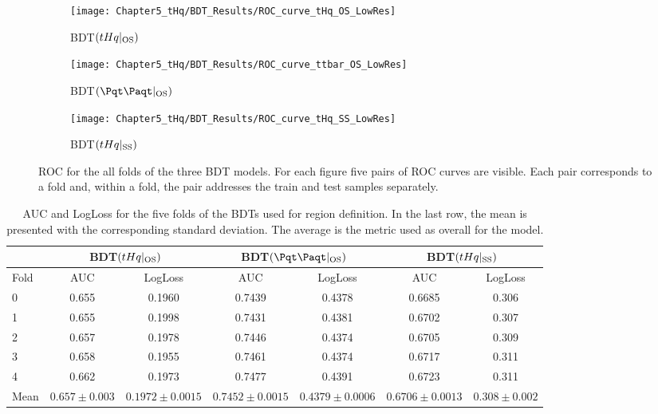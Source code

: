 \begin{figure}[h]
  \centering  
  \begin{subfigure}[b]{0.31\textwidth}
    \centering
    \texttt{[image: Chapter5\_tHq/BDT\_Results/ROC\_curve\_tHq\_OS\_LowRes]}
    \caption{BDT$(tHq|_{\text{OS}})$}
     \label{fig:ChaptH:EventSelection:BDT:ROC_Curves:tHqOS}
  \end{subfigure}
  \hfill
  \begin{subfigure}[b]{0.31\textwidth}
    \centering
    \texttt{[image: Chapter5\_tHq/BDT\_Results/ROC\_curve\_ttbar\_OS\_LowRes]}
    \caption{BDT$(\ttbar|_{\text{OS}})$}
     \label{fig:ChaptH:EventSelection:BDT:ROC_Curves:ttbarOS}
  \end{subfigure}
    \hfill
  \begin{subfigure}[b]{0.31\textwidth}
    \centering
    \texttt{[image: Chapter5\_tHq/BDT\_Results/ROC\_curve\_tHq\_SS\_LowRes]}
    \caption{BDT$(tHq|_{\text{SS}})$}
     \label{fig:ChaptH:EventSelection:BDT:ROC_Curves:tHqSS}
  \end{subfigure}
  \caption{ROC for the all folds of the three BDT models. For each figure five pairs of ROC curves are visible. 
  Each pair corresponds to a fold and, within a fold, the pair addresses the train and test samples separately. }
  \label{fig:ChaptH:EventSelection:BDT:ROC_Curves}
\end{figure}

\begin{table}[h]
\centering
 \begin{adjustbox}{max width=0.99\textwidth}
\begin{tabular}{l|cc|cc|cc}
\cline{2-7}
\multicolumn{1}{c|}{} & \multicolumn{2}{c|}{BDT$(tHq|_{\text{OS}})$} & \multicolumn{2}{c|}{BDT$(\ttbar|_{\text{OS}})$} & \multicolumn{2}{c}{BDT$(tHq|_{\text{SS}})$} \\  \midrule
Fold 		& AUC    			& LogLoss 		& AUC    		& LogLoss 		& AUC    		& LogLoss \\  \midrule
0    		& 0.655			& 0.1960   		& 0.7439 		& 0.4378   		& 0.6685 		& 0.306   \\
1    		& 0.655			& 0.1998   		& 0.7431 		& 0.4381   		& 0.6702 		& 0.307   \\
2    		& 0.657 			& 0.1978   		& 0.7446 		& 0.4374   		& 0.6705 		& 0.309   \\
3    		& 0.658 			& 0.1955   		& 0.7461 		& 0.4374   		& 0.6717 		& 0.311   \\
4    		& 0.662 			& 0.1973   		& 0.7477 		& 0.4391   		& 0.6723 		& 0.311   \\  \midrule
Mean     & $0.657\pm0.003$&$0.1972 \pm 0.0015$&$0.7452 \pm 0.0015$&$0.4379\pm 0.0006$&$0.6706 \pm0.0013$&$0.308\pm 0.002$  \\ \bottomrule
\end{tabular}
\end{adjustbox}
\caption{AUC and LogLoss for the five folds of the BDTs used for region definition. 
In the last row, the mean is presented with the corresponding standard deviation.
The average is the metric used as overall for the model.}
\label{tab:ChaptH:EventSelection:BDT:Metrics}
\end{table}

